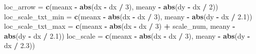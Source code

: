 \documentclass[]{article}
\newenvironment{Shaded}{\begin{snugshade}}{\end{snugshade}}
\newcommand{\KeywordTok}[1]{\textcolor[rgb]{0.13,0.29,0.53}{\textbf{#1}}}
\newcommand{\DecValTok}[1]{\textcolor[rgb]{0.00,0.00,0.81}{#1}}
\newcommand{\FloatTok}[1]{\textcolor[rgb]{0.00,0.00,0.81}{#1}}
\newcommand{\StringTok}[1]{\textcolor[rgb]{0.31,0.60,0.02}{#1}}
\newcommand{\OperatorTok}[1]{\textcolor[rgb]{0.81,0.36,0.00}{\textbf{#1}}}
\newcommand{\NormalTok}[1]{#1}
\begin{document}
\begin{Shaded}
\begin{Highlighting}[]
{{{{\NormalTok{  loc_arrow =}\StringTok{ }\KeywordTok{c}\NormalTok{(meanx }\OperatorTok{-}\StringTok{ }\KeywordTok{abs}\NormalTok{(dx }\OperatorTok{-}\StringTok{ }\NormalTok{dx }\OperatorTok{/}\StringTok{ }\DecValTok{3}\NormalTok{), meany }\OperatorTok{-}\StringTok{ }\KeywordTok{abs}\NormalTok{(dy }\OperatorTok{-}\StringTok{ }\NormalTok{dx }\OperatorTok{/}\StringTok{ }\DecValTok{2}\NormalTok{))}
\NormalTok{  loc_scale_txt_min =}\StringTok{ }\KeywordTok{c}\NormalTok{(meanx }\OperatorTok{-}\StringTok{ }\KeywordTok{abs}\NormalTok{(dx }\OperatorTok{-}\StringTok{ }\NormalTok{dx }\OperatorTok{/}\StringTok{ }\DecValTok{3}\NormalTok{), meany }\OperatorTok{-}\StringTok{ }\KeywordTok{abs}\NormalTok{(dy }\OperatorTok{-}\StringTok{ }\NormalTok{dx }\OperatorTok{/}
\StringTok{                                                                }\FloatTok{2.1}\NormalTok{))}
\NormalTok{  loc_scale_txt_max =}
\StringTok{    }\KeywordTok{c}\NormalTok{(meanx }\OperatorTok{-}\StringTok{ }\KeywordTok{abs}\NormalTok{(dx }\OperatorTok{-}\StringTok{ }\NormalTok{dx }\OperatorTok{/}\StringTok{ }\DecValTok{3}\NormalTok{) }\OperatorTok{+}\StringTok{ }\NormalTok{scale_num, meany }\OperatorTok{-}\StringTok{ }\KeywordTok{abs}\NormalTok{(dy }\OperatorTok{-}\StringTok{ }\NormalTok{dx }\OperatorTok{/}\StringTok{ }\FloatTok{2.1}\NormalTok{))}
\NormalTok{  loc_scale =}\StringTok{ }\KeywordTok{c}\NormalTok{(meanx }\OperatorTok{-}\StringTok{ }\KeywordTok{abs}\NormalTok{(dx }\OperatorTok{-}\StringTok{ }\NormalTok{dx }\OperatorTok{/}\StringTok{ }\DecValTok{3}\NormalTok{), meany }\OperatorTok{-}\StringTok{ }\KeywordTok{abs}\NormalTok{(dy }\OperatorTok{-}\StringTok{ }\NormalTok{dx }\OperatorTok{/}\StringTok{ }\FloatTok{2.3}\NormalTok{))}
  
}}}}
\end{Highlighting}
\end{Shaded}
\end{document}
